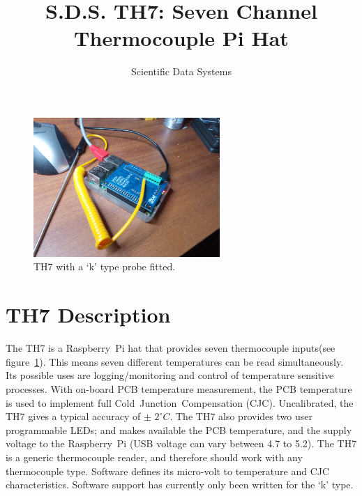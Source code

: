 \documentclass[10pt,foldmark]{leaflet}
\title{S.D.S. TH7: Seven Channel Thermocouple  Pi Hat}
\author{Scientific Data Systems}
\begin{document}
\maketitle

\begin{figure}
 \centering
 \includegraphics[width=200pt]{./TH7_0p4_IMG_20181010_184556D.jpg}
 \caption{TH7 with a `k' type probe fitted.}
 \label{fig:th7}
\end{figure}



\section{TH7 Description}
%
The TH7 is a Raspberry~Pi hat   that
provides seven thermocouple inputs(see figure~\ref{fig:th7}).
%
This means seven different temperatures can be read
simultaneously. 
%
Its possible uses are 
logging/monitoring and control of temperature sensitive processes.
%
With on-board PCB temperature measurement, 
the PCB temperature
is used to implement
full Cold~Junction~Compensation (CJC).
%
Uncalibrated, the TH7 gives a typical accuracy of $\pm$ ${2}^{\circ} C$.
%
The TH7 also provides two user programmable LEDs; and 
makes available the PCB temperature, and the supply voltage to the Raspberry~Pi (USB voltage can vary between 4.7 to 5.2).
\clearpage
The TH7 is a generic thermocouple reader, and therefore should work with any thermocouple type.
%
Software defines its micro-volt to temperature and CJC characteristics.
Software support has currently only been written for the `k' type.

\end{document}

